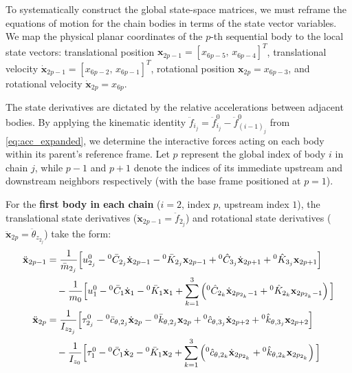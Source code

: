 \documentclass[11pt]{article}
\theoremstyle{definition}
\begin{document}
To systematically construct the global state-space matrices, we must reframe the equations of motion for the chain bodies in terms of the state vector variables. We map the physical planar coordinates of the $p$-th sequential body to the local state vectors: translational position $\mathbf{x}_{2p-1} = [x_{6p-5},\, x_{6p-4}]^T$, translational velocity $\dot{\mathbf{x}}_{2p-1} = [x_{6p-2},\, x_{6p-1}]^T$, rotational position $\mathbf{x}_{2p} = x_{6p-3}$, and rotational velocity $\dot{\mathbf{x}}_{2p} = x_{6p}$.

The state derivatives are dictated by the relative accelerations between adjacent bodies. By applying the kinematic identity $\ddot{f}_{i_j} = \ddot{f}^0_{i_j} - \ddot{f}^0_{(i-1)_j}$ from \eqref{eq:acc_expanded}, we determine the interactive forces acting on each body within its parent's reference frame. Let $p$ represent the global index of body $i$ in chain $j$, while $p-1$ and $p+1$ denote the indices of its immediate upstream and downstream neighbors respectively (with the base frame positioned at $p=1$). 


For the \textbf{first body in each chain} ($i=2$, index $p$, upstream index $1$), the translational state derivatives ($\ddot{\mathbf{x}}_{2p-1} = \ddot{f}_{2_j}$) and rotational state derivatives ($\ddot{\mathbf{x}}_{2p} = \ddot{\theta}_{z_{2_j}}$) take the form:
\begin{align}
    \ddot{\mathbf{x}}_{2p-1} &= 
    \frac{1}{\bar{m}_{2_j}} \Big[ u^0_{2_j} - {}^0\bar{C}_{2_j}\dot{\mathbf{x}}_{2p-1} - {}^0\bar{K}_{2_j}\mathbf{x}_{2p-1} + {}^0\hat{C}_{3_j}\dot{\mathbf{x}}_{2p+1} + {}^0\hat{K}_{3_j}\mathbf{x}_{2p+1} \Big] \notag \\
    &\quad - \frac{1}{m_0} \Big[ u^0_1 - {}^0\bar{C}_1\dot{\mathbf{x}}_{1} - {}^0\bar{K}_1 \mathbf{x}_{1} + \sum_{k=1}^3 \left( {}^0\hat{C}_{2_k}\dot{\mathbf{x}}_{2p_{2_k}-1} + {}^0\hat{K}_{2_k}\mathbf{x}_{2p_{2_k}-1} \right) \Big] \\
    \ddot{\mathbf{x}}_{2p} &= 
    \frac{1}{I_{z_{2_j}}} \Big[ \tau^0_{2_j} - {}^0\bar{c}_{\theta,2_j}\dot{\mathbf{x}}_{2p} - {}^0\bar{k}_{\theta,2_j}\mathbf{x}_{2p} + {}^0\hat{c}_{\theta,3_j}\dot{\mathbf{x}}_{2p+2} + {}^0\hat{k}_{\theta,3_j}\mathbf{x}_{2p+2} \Big] \notag \\
    &\quad - \frac{1}{I_{z_0}} \Big[ \tau^0_1 - {}^0\bar{C}_1\dot{\mathbf{x}}_{2} - {}^0\bar{K}_1 \mathbf{x}_{2} + \sum_{k=1}^3 \left( {}^0\hat{c}_{\theta,2_k}\dot{\mathbf{x}}_{2p_{2_k}} + {}^0\hat{k}_{\theta,2_k}\mathbf{x}_{2p_{2_k}} \right) \Big]
\end{align}
\end{document}
